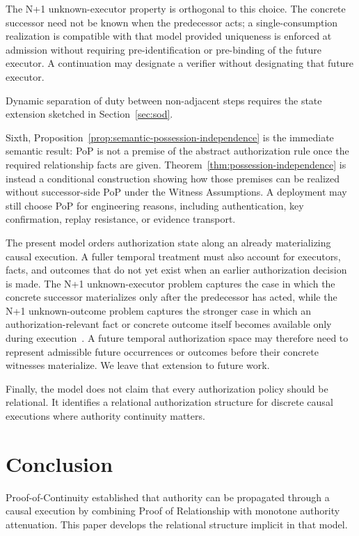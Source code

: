 \documentclass[10pt,twocolumn]{article}
\begin{document}
The N+1 unknown-executor property is orthogonal to this choice. The concrete
successor need not be known when the predecessor acts; a single-consumption
realization is compatible with that model provided uniqueness is enforced at
admission without requiring pre-identification or pre-binding of the future
executor. A continuation may designate a verifier without designating that
future executor.

Dynamic separation of duty between non-adjacent steps requires the state
extension sketched in Section~\ref{sec:sod}.

Sixth, Proposition~\ref{prop:semantic-possession-independence} is the immediate
semantic result: PoP is not a premise of the abstract authorization rule once
the required relationship facts are given. Theorem~\ref{thm:possession-independence}
is instead a conditional construction showing how those premises can be
realized without successor-side PoP under the Witness Assumptions. A deployment
may still choose PoP for engineering reasons, including authentication, key
confirmation, replay resistance, or evidence transport.

The present model orders authorization state along an already materializing
causal execution. A fuller temporal treatment must also account for executors,
facts, and outcomes that do not yet exist when an earlier authorization
decision is made. The N+1 unknown-executor problem captures the case in which
the concrete successor materializes only after the predecessor has acted,
while the N+1 unknown-outcome problem captures the stronger case in which an
authorization-relevant fact or concrete outcome itself becomes available only
during execution~\cite{picNPlus1Executor,picNPlus1Outcome}. A future temporal
authorization space may therefore need to represent admissible future
occurrences or outcomes before their concrete witnesses materialize. We leave
that extension to future work.

Finally, the model does not claim that every authorization policy should be
relational. It identifies a relational authorization structure for discrete
causal executions where authority continuity matters.

\section{Conclusion}

Proof-of-Continuity established that authority can be propagated through a
causal execution by combining Proof of Relationship with monotone authority
attenuation. This paper develops the relational structure implicit in that
model.
\end{document}
